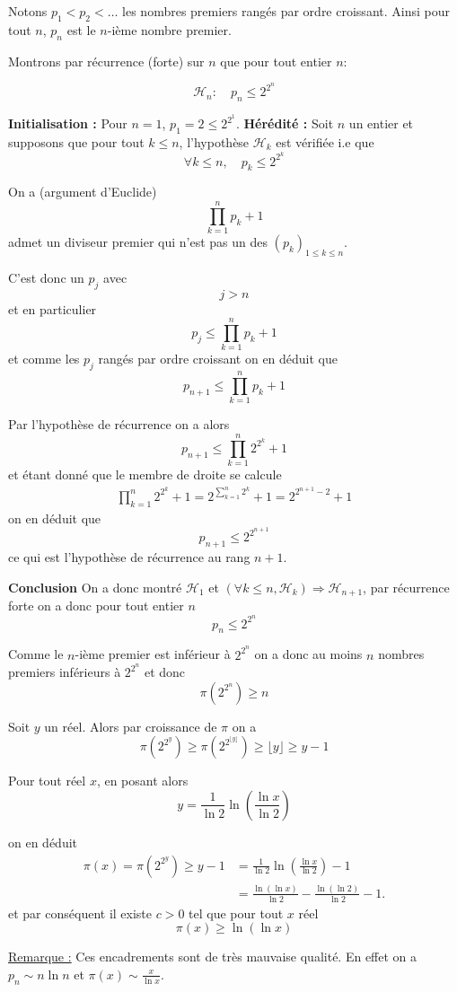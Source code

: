 \begin{sol}
Notons $p_1 < p_2 < \ldots$ les nombres premiers rangés par ordre croissant. Ainsi pour tout $n$, $p_n$ est le $n$-ième nombre premier.

Montrons par récurrence (forte) sur $n$ que pour tout entier $n$:

$$\mathcal H_n : \quad p_n \le 2^{2^n}$$

\textbf{Initialisation :} Pour $n = 1$, $p_1 = 2 \le 2^{2^1}$.
\textbf{Hérédité :} Soit $n$ un entier et supposons que pour tout $k \le n$, l'hypothèse $\mathcal H_k$ est vérifiée i.e que
$$\forall k \le n, \quad p_k \le 2^{2^k}$$

On a (argument d'Euclide)
$$\prod_{k = 1}^n p_k + 1$$
admet un diviseur premier qui n'est pas un des $(p_k)_{1 \le k \le n}$.

C'est donc un $p_j$ avec $$j > n$$ et en particulier
$$p_j \le \prod_{k = 1}^n p_k + 1$$
et comme les $p_j$ rangés par ordre croissant on en déduit que
$$p_{n + 1} \le \prod_{k = 1}^n p_k + 1$$

Par l'hypothèse de récurrence on a alors
$$p_{n + 1} \le \prod_{k = 1}^n 2^{2^k} + 1$$
et étant donné que le membre de droite se calcule
\begin{eqnarray*}
\prod_{k = 1}^n 2^{2^k} + 1 = 2^{\sum_{k = 1}^n 2^k} + 1 = 2^{2^{n + 1} - 2} + 1
\end{eqnarray*}
on en déduit que
$$p_{n + 1} \le 2^{2^{n + 1}}$$
ce qui est l'hypothèse de récurrence au rang $n + 1$.


\textbf{Conclusion} On a donc montré $\mathcal H_1$ et $\left(\forall k \le n, \mathcal H_k \right) \Rightarrow \mathcal H_{n + 1}$, par récurrence forte on a donc pour tout entier $n$
$$\boxed{p_n \le 2^{2^n}}$$

Comme le $n$-ième premier est inférieur à $2^{2^n}$ on a donc au moins $n$ nombres premiers inférieurs à $2^{2^n}$ et donc 
$$\pi(2^{2^n}) \ge n$$

Soit $y$ un réel. Alors par croissance de $\pi$ on a
$$\pi(2^{2^y}) \ge \pi(2^{2^{\lfloor y \rfloor}})  \ge \lfloor y \rfloor \ge y - 1$$

Pour tout réel $x$, en posant alors
$$ y = \frac{1}{\ln 2}\ln \left( \frac{\ln x}{\ln 2} \right) $$

on en déduit
\begin{equation*}
    \begin{aligned}
        \pi(x) = \pi \left( 2^{2^y} \right) \ge y -1 & = \frac{1}{\ln 2}\ln \left( \frac{\ln x}{\ln 2} \right) -1\\
        & = \frac{\ln(\ln x)}{\ln 2}- \frac{\ln(\ln 2)}{\ln 2} -1.
    \end{aligned}
\end{equation*}
et par conséquent il existe $c > 0$ tel que pour tout $x$ réel
$$\boxed{\pi(x) \ge \ln(\ln x)}$$

\underline{Remarque :} Ces encadrements sont de très mauvaise qualité. En effet on a $p_n \sim n \ln n$ et $\pi(x) \sim \frac x {\ln x}$.
\end{sol}

